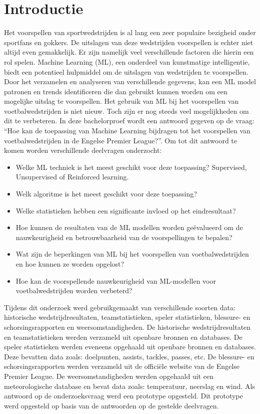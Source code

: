 
\section{Introductie}%
\label{sec:introductie}

Het voorspellen van sportwedstrijden is al lang een zeer populaire bezigheid onder sportfans en gokkers. De uitslagen van deze wedstrijden voorspellen is echter niet altijd even gemakkelijk. Er zijn namelijk veel verschillende factoren die hierin een rol spelen.
Machine Learning (ML), een onderdeel van kunstmatige intelligentie, biedt een potentieel hulpmiddel om de uitslagen van wedstrijden te voorspellen. Door het verzamelen en analyseren van verschillende gegevens, kan een ML model patronen en trends identificeren die dan gebruikt kunnen worden om een mogelijke uitslag te voorspellen.
Het gebruik van ML bij het voorspellen van voetbalwedstrijden is niet nieuw. Toch zijn er nog steeds veel mogelijkheden om dit te verbeteren. In deze bachelorproef wordt een antwoord gegeven op de vraag: “Hoe kan de toepassing van Machine Learning bijdragen tot het voorspellen van voetbalwedstrijden in de Engelse Premier League?”. Om tot dit antwoord te komen worden verschillende deelvragen onderzocht:

\begin{itemize}
  \item	Welke ML techniek is het meest geschikt voor deze toepassing? Supervised, Unsupervised of Reinforced learning.
  \item	Welk algoritme is het meest geschikt voor deze toepassing?
  \item	Welke statistieken hebben een significante invloed op het eindresultaat?
  \item	Hoe kunnen de resultaten van de ML modellen worden geëvalueerd om de nauwkeurigheid en betrouwbaarheid van de voorspellingen te bepalen?
  \item	Wat zijn de beperkingen van ML bij het voorspellen van voetbalwedstrijden en hoe kunnen ze worden opgelost?
  \item	Hoe kan de voorspellende nauwkeurigheid van ML-modellen voor voetbalwedstrijden worden verbeterd?
\end{itemize}

Tijdens dit onderzoek werd gebruikgemaakt van verschillende soorten data: historische wedstrijdresultaten, teamstatistieken, speler statistieken, blessure- en schorsingsrapporten en weersomstandigheden. De historische wedstrijdresultaten en teamstatistieken werden verzameld uit openbare bronnen en databases. De speler statistieken werden eveneens opgehaald uit openbare bronnen en databases. Deze bevatten data zoals: doelpunten, assists, tackles, passes, etc. De blessure- en schorsingsrapporten werden verzameld uit de officiële website van de Engelse Premier League. De weersomstandigheden werden opgehaald uit een meteorologische database en bevat data zoals: temperatuur, neerslag en wind.
Als antwoord op de onderzoeksvraag werd een prototype opgesteld. Dit prototype werd opgesteld op basis van de antwoorden op de gestelde deelvragen.


